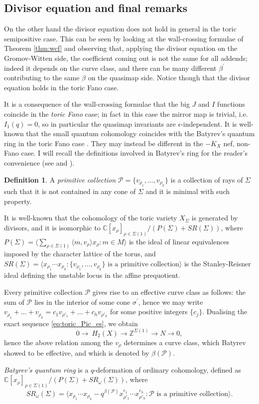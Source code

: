 \documentclass[11pt]{amsart}
\newcommand{\Z}{\mathbb{Z}}
\renewcommand{\to}{\rightarrow}
\theoremstyle{definition}
\theoremstyle{definition}
\newtheorem{definition}[thm]{Definition}
\newcommand{\ilemph}[1]{\emph{#1}}
\begin{document}
\subsection{Divisor equation and final remarks} On the other hand the divisor equation does not hold in general in the toric semipositive case. This can be seen by looking at the wall-crossing formulae of Theorem \ref{thm:wcf} and observing that, applying the divisor equation on the Gromov-Witten side, the coefficient coming out is not the same for all addends; indeed it depends on the curve class, and there can be many different $\beta^\prime$ contributing to the same $\beta$ on the quasimap side. Notice though that the divisor equation holds in the toric Fano case.

It is a consequence of the wall-crossing formulae that the big $J$ and $I$ functions coincide in the \ilemph{toric Fano} case; in fact in this case the mirror map is trivial, i.e. $I_1(q)=0$, so in particular the quasimap invariants are $\epsilon$-independent. It is well-known that the small quantum cohomology coincides with the Batyrev's quantum ring in the toric Fano case \cite[Example 11.2.5.2]{MS}. They may instead be different in the $-K_X$ nef, non-Fano case. I will recall the definitions involved in Batyrev's ring for the reader's convenience (see \cite{Batyrev} and \cite[Example 8.1.2.2]{MS}).
\begin{definition}
 A \emph{primitive collection} $\mathcal P=\{v_{\rho_1},\ldots,v_{\rho_k}\}$ is a collection of rays of $\Sigma$ such that it is not contained in any cone of $\Sigma$ and it is minimal with such property.
 
 It is well-known that the cohomology of the toric variety $X_\Sigma$ is generated by divisors, and it is isomorphic to $\mathbb C[x_\rho]_{\rho\in\Sigma(1)}/(P(\Sigma)+SR(\Sigma))$, where $P(\Sigma)=\langle \sum_{\rho\in\Sigma(1)}\langle m,v_\rho\rangle x_\rho : m\in M\rangle$ is the ideal of linear equivalences imposed by the character lattice of the torus, and $SR(\Sigma)=\langle x_{\rho_1}\cdots x_{\rho_k} : \{v_{\rho_1},\ldots,v_{\rho_k}\} \text{ is a primitive collection}\rangle$ is the Stanley-Reisner ideal defining the unstable locus in the affine prequotient.
 
 Every primitive collection $\mathcal P$ gives rise to an effective curve class as follows: the sum of $\mathcal P$ lies in the interior of some cone $\sigma^\prime$, hence we may write $v_{\rho_1}+\ldots+v_{\rho_k}=c_{1}v_{\rho'_1}+\ldots+c_{h}v_{\rho'_h}$ for some positive integers $\{c_j\}$. Dualising the exact sequence \eqref{eq:toric_Pic_es}, we obtain \[0\to\ H_2(X)\to \Z^{\Sigma(1)}\to N\to 0,\] hence the above relation among the $v_\rho$ determines a curve class, which Batyrev showed to be effective, and which is denoted by $\beta(\mathcal P)$.
 
 \emph{Batyrev's quantum ring} is a $q$-deformation of ordinary cohomology, defined as $\mathbb C[x_\rho]_{\rho\in\Sigma(1)}/(P(\Sigma)+SR_\omega(\Sigma))$, where \[SR_\omega(\Sigma)=\langle x_{\rho_1}\cdots x_{\rho_k}-q^{\beta(\mathcal P)}x_{\rho'_1}^{c_1}\cdots x_{\rho'_h}^{c_h} : \mathcal P\text{ is a primitive collection}\rangle.\]
\end{definition}
\end{document}
